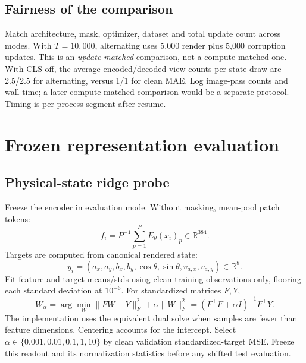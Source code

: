 \documentclass[11pt,a4paper]{article}
\newcommand{\R}{\mathbb{R}}
\begin{document}
\subsection{Fairness of the comparison}
Match architecture, mask, optimizer, dataset and total update count across modes.
With $T=10{,}000$, alternating uses 5,000 render plus 5,000 corruption updates.
This is an \emph{update-matched} comparison, not a compute-matched one. With CLS off,
the average encoded/decoded view counts per state draw are 2.5/2.5 for alternating,
versus 1/1 for clean MAE. Log image-pass counts and wall time; a later compute-matched
comparison would be a separate protocol. Timing is per process segment after resume.

\section{Frozen representation evaluation}
\subsection{Physical-state ridge probe}
Freeze the encoder in evaluation mode. Without masking, mean-pool patch tokens:
\begin{equation}
f_i=P^{-1}\sum_{p=1}^{P}E_\theta(x_i)_p\in\R^{384}.
\end{equation}
Targets are computed from canonical rendered state:
\begin{equation}
y_i=(a_x,a_y,b_x,b_y,\cos\theta,\sin\theta,v_{a,x},v_{a,y})\in\R^8.
\end{equation}
Fit feature and target means/stds using clean training observations only, flooring
each standard deviation at $10^{-6}$. For standardized matrices $F,Y$,
\begin{equation}
W_\alpha=\arg\min_W\|FW-Y\|_F^2+\alpha\|W\|_F^2
=(F^\top F+\alpha I)^{-1}F^\top Y.
\end{equation}
The implementation uses the equivalent dual solve when samples are fewer than
feature dimensions. Centering accounts for the intercept. Select
$\alpha\in\{0.001,0.01,0.1,1,10\}$ by clean validation standardized-target MSE.
Freeze this readout and its normalization statistics before any shifted test evaluation.
\end{document}
